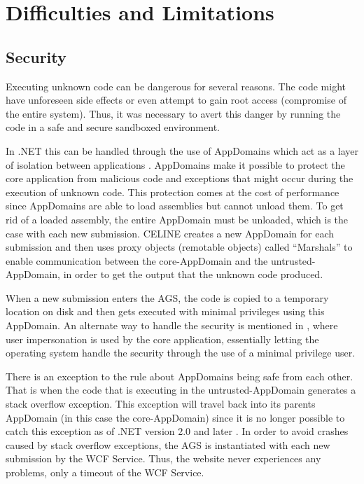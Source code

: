 \section{Difficulties and Limitations}

\subsection{Security} \label{subsec:security}
Executing unknown code can be dangerous for several reasons. The code might have unforeseen side effects or even attempt to gain root access (compromise of the entire system). Thus, it was necessary to avert this danger by running the code in a safe and secure sandboxed environment.

In .NET this can be handled through the use of AppDomains which act as a layer of isolation between applications \cite{ApplicationDomains}. AppDomains make it possible to protect the core application from malicious code and exceptions that might occur during the execution of unknown code. This protection comes at the cost of performance since AppDomains are able to load assemblies but cannot unload them. To get rid of a loaded assembly, the entire AppDomain must be unloaded, which is the case with each new submission. CELINE creates a new AppDomain for each submission and then uses proxy objects (remotable objects) called ``Marshals'' \cite{Marshals} to enable communication between the core-AppDomain and the untrusted-AppDomain, in order to get the output that the unknown code produced. 

When a new submission enters the AGS, the code is copied to a temporary location on disk and then gets executed with minimal privileges using this AppDomain. An alternate way to handle the security is mentioned in \cite{Suleman}, where user impersonation is used by the core application, essentially letting the operating system handle the security through the use of a minimal privilege user.

There is an exception to the rule about AppDomains being safe from each other. That is when the code that is executing in the untrusted-AppDomain generates a stack overflow exception. This exception will travel back into its parents AppDomain (in this case the core-AppDomain) since it is no longer possible to catch this exception as of .NET version 2.0 and later \cite{StackOverflowException}. In order to avoid crashes caused by stack overflow exceptions, the AGS is instantiated with each new submission by the WCF Service. Thus, the website never experiences any problems, only a timeout of the WCF Service.


